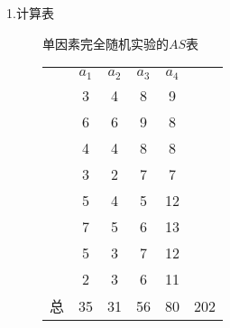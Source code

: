 \begin{description}
\item[1.计算表] 
\begin{margintable}
	\centering
	\caption{单因素完全随机实验的$AS$表}
	\label{one_way_ANOVA_AS_TAB}
	{
		\begin{tabular}{cccccc}
			\toprule
    			     & $a_1$ &  $a_2$ &  $a_3$ &  $a_4$ & \\
                              & \cellcolor[rgb]{ .851,  .851,  .851}3 & \cellcolor[rgb]{ .851,  .851,  .851}4 & \cellcolor[rgb]{ .851,  .851,  .851}8 & \cellcolor[rgb]{ .851,  .851,  .851}9 &  \\
                              & \cellcolor[rgb]{ .851,  .851,  .851}6 & \cellcolor[rgb]{ .851,  .851,  .851}6 & \cellcolor[rgb]{ .851,  .851,  .851}9 & \cellcolor[rgb]{ .851,  .851,  .851}8 &  \\
                              & \cellcolor[rgb]{ .851,  .851,  .851}4 & \cellcolor[rgb]{ .851,  .851,  .851}4 & \cellcolor[rgb]{ .851,  .851,  .851}8 & \cellcolor[rgb]{ .851,  .851,  .851}8 &  \\
                              & \cellcolor[rgb]{ .851,  .851,  .851}3 & \cellcolor[rgb]{ .851,  .851,  .851}2 & \cellcolor[rgb]{ .851,  .851,  .851}7 & \cellcolor[rgb]{ .851,  .851,  .851}7 &  \\
                              & \cellcolor[rgb]{ .851,  .851,  .851}5 & \cellcolor[rgb]{ .851,  .851,  .851}4 & \cellcolor[rgb]{ .851,  .851,  .851}5 & \cellcolor[rgb]{ .851,  .851,  .851}12 &  \\
                              & \cellcolor[rgb]{ .851,  .851,  .851}7 & \cellcolor[rgb]{ .851,  .851,  .851}5 & \cellcolor[rgb]{ .851,  .851,  .851}6 & \cellcolor[rgb]{ .851,  .851,  .851}13 &  \\
                              & \cellcolor[rgb]{ .851,  .851,  .851}5 & \cellcolor[rgb]{ .851,  .851,  .851}3 & \cellcolor[rgb]{ .851,  .851,  .851}7 & \cellcolor[rgb]{ .851,  .851,  .851}12 &  \\
                              & \cellcolor[rgb]{ .851,  .851,  .851}2 & \cellcolor[rgb]{ .851,  .851,  .851}3 & \cellcolor[rgb]{ .851,  .851,  .851}6 & \cellcolor[rgb]{ .851,  .851,  .851}11 &  \\
                        总     & \cellcolor[rgb]{ .886,  .937,  .855}35 & \cellcolor[rgb]{ .886,  .937,  .855}31 & \cellcolor[rgb]{ .886,  .937,  .855}56 & \cellcolor[rgb]{ .886,  .937,  .855}80 & \cellcolor[rgb]{ .867,  .922,  .969}202 \\


\end{tabular}}
\end{margintable}
\end{description}
